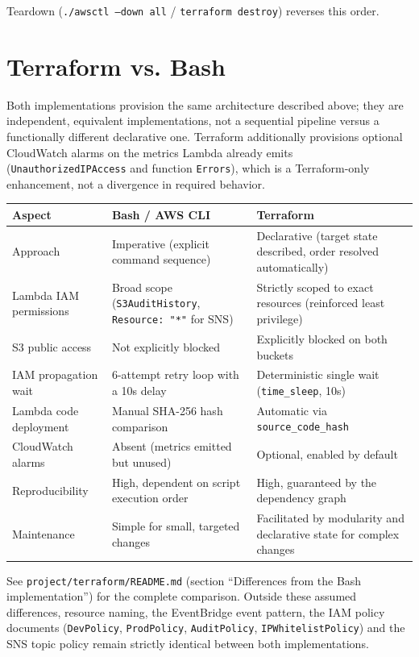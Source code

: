 \documentclass[11pt,a4paper]{report}
\begin{document}
Teardown (\texttt{./awsctl --down all} / \texttt{terraform destroy}) reverses
this order.

\section{Terraform vs. Bash}

Both implementations provision the same architecture described above; they
are independent, equivalent implementations, not a sequential pipeline versus
a functionally different declarative one. Terraform additionally provisions
optional CloudWatch alarms on the metrics Lambda already emits
(\texttt{UnauthorizedIPAccess} and function \texttt{Errors}), which is a
Terraform-only enhancement, not a divergence in required behavior.

\begin{center}
\renewcommand{\arraystretch}{1.35}
{\small
\begin{tabularx}{\linewidth}{X X X}
\toprule
\textbf{Aspect} & \textbf{Bash / AWS CLI} & \textbf{Terraform} \\
\midrule
Approach & Imperative (explicit command sequence) & Declarative (target state described, order resolved automatically) \\
Lambda IAM permissions & Broad scope (\texttt{S3AuditHistory}, \texttt{Resource: "*"} for SNS) & Strictly scoped to exact resources (reinforced least privilege) \\
S3 public access & Not explicitly blocked & Explicitly blocked on both buckets \\
IAM propagation wait & 6-attempt retry loop with a 10s delay & Deterministic single wait (\texttt{time\_sleep}, 10s) \\
Lambda code deployment & Manual SHA-256 hash comparison & Automatic via \texttt{source\_code\_hash} \\
CloudWatch alarms & Absent (metrics emitted but unused) & Optional, enabled by default \\
Reproducibility & High, dependent on script execution order & High, guaranteed by the dependency graph \\
Maintenance & Simple for small, targeted changes & Facilitated by modularity and declarative state for complex changes \\
\bottomrule
\end{tabularx}
}
\end{center}

\begin{notebox}[Note]
See \texttt{project/terraform/README.md} (section ``Differences from the
Bash implementation'') for the complete comparison. Outside these assumed
differences, resource naming, the EventBridge event pattern, the IAM policy
documents (\texttt{DevPolicy}, \texttt{ProdPolicy}, \texttt{AuditPolicy},
\texttt{IPWhitelistPolicy}) and the SNS topic policy remain strictly
identical between both implementations.
\end{notebox}
\end{document}
